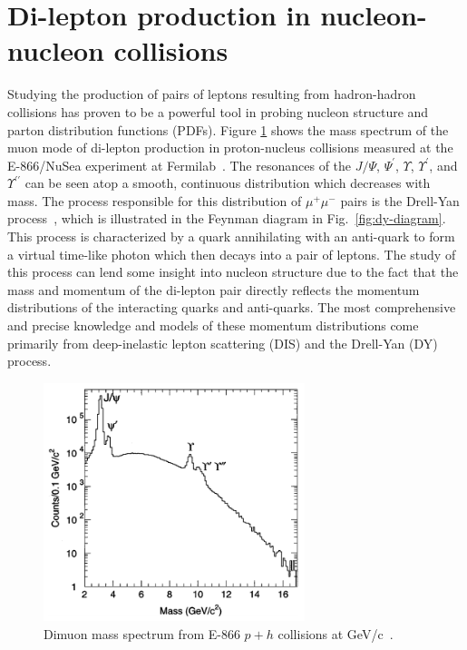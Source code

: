\section{Di-lepton production in nucleon-nucleon collisions}

Studying the production of pairs of leptons resulting from hadron-hadron collisions has proven to be a powerful tool in probing nucleon structure and parton distribution functions (PDFs). Figure \ref{fig:DY-spectrum} shows the mass spectrum of the muon mode of di-lepton production in proton-nucleus collisions measured at the E-866/NuSea experiment at Fermilab~\cite{PhysRevLett.80.3715}. The resonances of the $J/\Psi$, $\Psi^\prime$, $\Upsilon$, $\Upsilon^\prime$, and $\Upsilon^{\prime\prime}$ can be seen atop a smooth, continuous distribution which decreases with mass. The process responsible for this distribution of $\mu^+\mu^-$ pairs is the Drell-Yan process~\cite{PhysRevLett.25.316}, which is illustrated in the Feynman diagram in Fig.~\ref{fig:dy-diagram}. This process is characterized by a quark annihilating with an anti-quark to form a virtual time-like photon which then decays into a pair of leptons. The study of this process can lend some insight into nucleon structure due to the fact that the mass and momentum of the di-lepton pair directly reflects the momentum distributions of the interacting quarks and anti-quarks. The most comprehensive and precise knowledge and models of these momentum distributions come primarily from deep-inelastic lepton scattering (DIS) and the Drell-Yan (DY) process.

\begin{figure}
	\centering
	\includegraphics[width=3in]{figures/background/DY-spectrum-e866.png}
	\caption{Dimuon mass spectrum from E-866 $p+h$ collisions at \unit[800]{GeV/c}~\cite{PhysRevLett.80.3715}.}
	\label{fig:DY-spectrum}
\end{figure}


